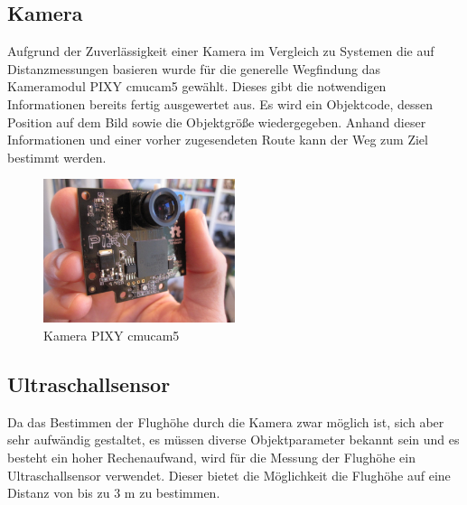 \subsection{Kamera}
Aufgrund der Zuverlässigkeit einer Kamera im Vergleich zu Systemen die auf Distanzmessungen basieren wurde für die generelle Wegfindung das Kameramodul PIXY cmucam5 gewählt. Dieses gibt die notwendigen Informationen bereits fertig ausgewertet aus. Es wird ein Objektcode, dessen Position auf dem Bild sowie die Objektgröße wiedergegeben.
Anhand dieser Informationen und einer vorher zugesendeten Route kann der Weg zum Ziel bestimmt werden.

\begin{figure}[tbh]
\begin{centering}
\includegraphics[width = 0.5\textwidth]{Bilder/PIXY}
\par\end{centering}
\caption{Kamera PIXY cmucam5}
\label{PIXY}
\end{figure}

\subsection{Ultraschallsensor}
Da das Bestimmen der Flughöhe durch die Kamera zwar möglich ist, sich aber sehr aufwändig gestaltet, es müssen diverse Objektparameter bekannt sein und es besteht ein hoher Rechenaufwand, wird für die Messung der Flughöhe ein Ultraschallsensor verwendet. Dieser bietet die Möglichkeit die Flughöhe auf eine Distanz von bis zu 3 m zu bestimmen.


